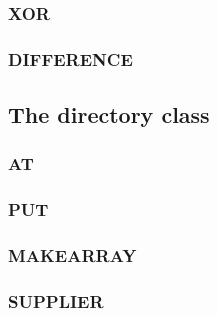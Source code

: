

\subsubsection{XOR}\label{xor-3}



\subsubsection{DIFFERENCE}\label{difference-3}



\subsection{The directory class}\label{the-directory-class}



\subsubsection{AT}\label{at-1}



\subsubsection{PUT}\label{put-5}



\subsubsection{MAKEARRAY}\label{makearray-3}



\subsubsection{SUPPLIER}\label{supplier-2}

